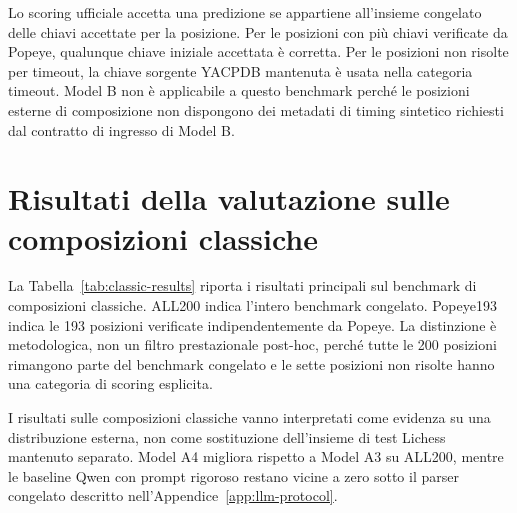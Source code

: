 

Lo scoring ufficiale accetta una predizione se appartiene all'insieme congelato delle chiavi accettate per la posizione.  Per le posizioni con più chiavi verificate da Popeye, qualunque chiave iniziale accettata è corretta.  Per le posizioni non risolte per timeout, la chiave sorgente YACPDB mantenuta è usata nella categoria timeout.  Model B non è applicabile a questo benchmark perché le posizioni esterne di composizione non dispongono dei metadati di timing sintetico richiesti dal contratto di ingresso di Model B.

\section{Risultati della valutazione sulle composizioni classiche}
\label{app:classic-benchmark:results}

La Tabella~\ref{tab:classic-results} riporta i risultati principali sul benchmark di composizioni classiche.  ALL200 indica l'intero benchmark congelato.  Popeye193 indica le 193 posizioni verificate indipendentemente da Popeye.  La distinzione è metodologica, non un filtro prestazionale post-hoc, perché tutte le 200 posizioni rimangono parte del benchmark congelato e le sette posizioni non risolte hanno una categoria di scoring esplicita.




I risultati sulle composizioni classiche vanno interpretati come evidenza su una distribuzione esterna, non come sostituzione dell'insieme di test Lichess mantenuto separato.  Model A4 migliora rispetto a Model A3 su ALL200, mentre le baseline Qwen con prompt rigoroso restano vicine a zero sotto il parser congelato descritto nell'Appendice~\ref{app:llm-protocol}.

